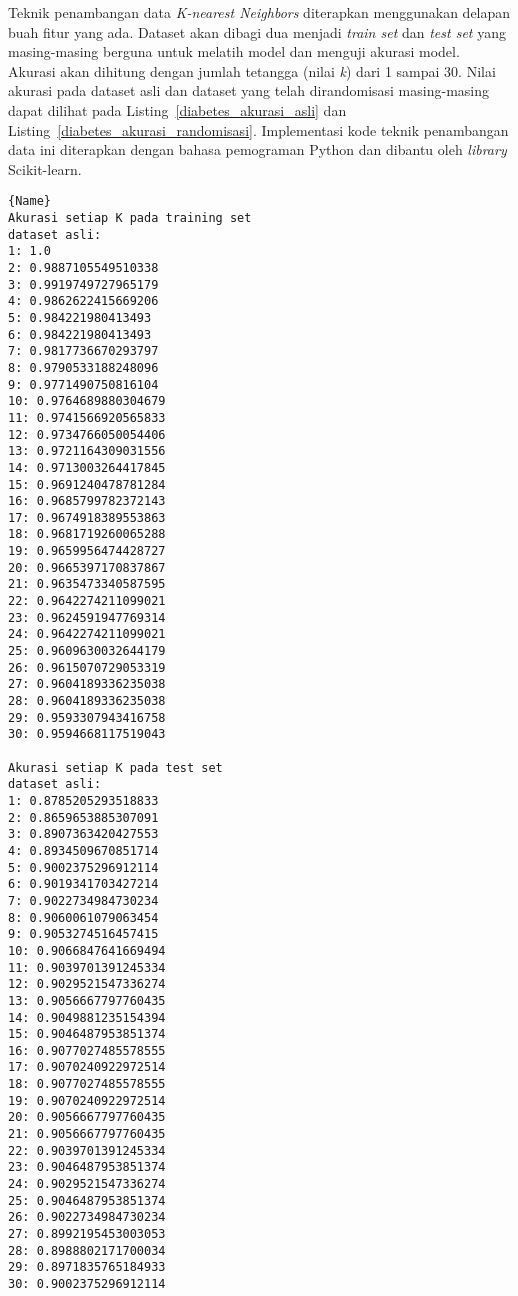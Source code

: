 Teknik penambangan data \textit{K-nearest Neighbors} diterapkan menggunakan delapan buah fitur yang ada. Dataset akan dibagi dua menjadi \textit{train set} dan \textit{test set} yang masing-masing berguna untuk melatih model dan menguji akurasi model. Akurasi akan dihitung dengan jumlah tetangga (nilai \textit{k}) dari 1 sampai 30. Nilai akurasi pada dataset asli dan dataset yang telah dirandomisasi masing-masing dapat dilihat pada Listing~\ref{diabetes_akurasi_asli} dan Listing~\ref{diabetes_akurasi_randomisasi}. Implementasi kode teknik penambangan data ini diterapkan dengan bahasa pemograman Python dan dibantu oleh \textit{library} Scikit-learn. 

\noindent\begin{minipage}{.48\textwidth}
\begin{lstlisting}[caption=Akurasi Dataset Asli,frame=tlrb, label=diabetes_akurasi_asli]{Name}
Akurasi setiap K pada training set 
dataset asli: 
1: 1.0
2: 0.9887105549510338
3: 0.9919749727965179
4: 0.9862622415669206
5: 0.984221980413493
6: 0.984221980413493
7: 0.9817736670293797
8: 0.9790533188248096
9: 0.9771490750816104
10: 0.9764689880304679
11: 0.9741566920565833
12: 0.9734766050054406
13: 0.9721164309031556
14: 0.9713003264417845
15: 0.9691240478781284
16: 0.9685799782372143
17: 0.9674918389553863
18: 0.9681719260065288
19: 0.9659956474428727
20: 0.9665397170837867
21: 0.9635473340587595
22: 0.9642274211099021
23: 0.9624591947769314
24: 0.9642274211099021
25: 0.9609630032644179
26: 0.9615070729053319
27: 0.9604189336235038
28: 0.9604189336235038
29: 0.9593307943416758
30: 0.9594668117519043

Akurasi setiap K pada test set 
dataset asli: 
1: 0.8785205293518833
2: 0.8659653885307091
3: 0.8907363420427553
4: 0.8934509670851714
5: 0.9002375296912114
6: 0.9019341703427214
7: 0.9022734984730234
8: 0.9060061079063454
9: 0.9053274516457415
10: 0.9066847641669494
11: 0.9039701391245334
12: 0.9029521547336274
13: 0.9056667797760435
14: 0.9049881235154394
15: 0.9046487953851374
16: 0.9077027485578555
17: 0.9070240922972514
18: 0.9077027485578555
19: 0.9070240922972514
20: 0.9056667797760435
21: 0.9056667797760435
22: 0.9039701391245334
23: 0.9046487953851374
24: 0.9029521547336274
25: 0.9046487953851374
26: 0.9022734984730234
27: 0.8992195453003053
28: 0.8988802171700034
29: 0.8971835765184933
30: 0.9002375296912114
\end{lstlisting}
\end{minipage}\hfill
